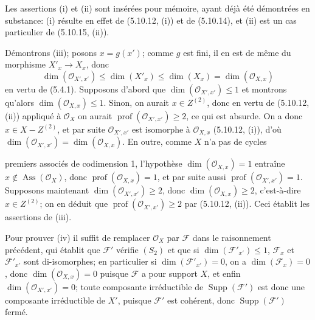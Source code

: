 \documentclass[10pt,oneside]{book}
\newcommand{\oldpage}[2][]{%
  \setcounter{footnote}{0}%
  \marginpar{\scriptsize\textbf{#1}~|~#2}\ignorespaces}
\begin{document}
Les assertions (i) et (ii) sont insérées pour mémoire, ayant déjà été
démontrées en substance: (i) résulte en effet de (5.10.12, (i)) et de
(5.10.14), et (ii) est un cas particulier de (5.10.15, (ii)).

Démontrons (iii); posons $x=g(x')$; comme $g$ est fini, il en est de même du
morphisme $X'_x\to X_x$, donc
\[
\dim(\mathcal O_{X',x'})\leq\dim(X'_x)\leq\dim(X_x)
=\dim(\mathcal O_{X,x})
\]
en vertu de (5.4.1). Supposons d'abord que
$\dim(\mathcal O_{X',x'})\leq1$ et montrons qu'alors
$\dim(\mathcal O_{X,x})\leq1$. Sinon, on aurait $x\in Z^{(2)}$, donc en vertu
de (5.10.12, (ii)) appliqué à $\mathcal O_X$ on aurait
$\operatorname{prof}(\mathcal O_{X',x'})\geq2$, ce qui est absurde. On a donc
$x\in X-Z^{(2)}$, et par suite $\mathcal O_{X',x'}$ est isomorphe à
$\mathcal O_{X,x}$ (5.10.12, (i)), d'où
$\dim(\mathcal O_{X',x'})=\dim(\mathcal O_{X,x})$. En outre, comme $X$ n'a
pas de cycles

\oldpage[IV-2]{121}

premiers associés de codimension 1, l'hypothèse
$\dim(\mathcal O_{X,x})=1$ entraîne $x\notin\operatorname{Ass}(\mathcal O_X)$,
donc $\operatorname{prof}(\mathcal O_{X,x})=1$, et par suite aussi
$\operatorname{prof}(\mathcal O_{X',x'})=1$. Supposons maintenant
$\dim(\mathcal O_{X',x'})\geq2$, donc $\dim(\mathcal O_{X,x})\geq2$,
c'est-à-dire $x\in Z^{(2)}$; on en déduit que
$\operatorname{prof}(\mathcal O_{X',x'})\geq2$ par (5.10.12, (ii)). Ceci
établit les assertions de (iii).

Pour prouver (iv) il suffit de remplacer $\mathcal O_X$ par $\mathcal F$ dans
le raisonnement précédent, qui établit que $\mathcal F'$ vérifie $(S_2)$ et
que si $\dim(\mathcal F'_{x'})\leq1$, $\mathcal F_x$ et
$\mathcal F'_{x'}$ sont di-isomorphes; en particulier si
$\dim(\mathcal F'_{x'})=0$, on a $\dim(\mathcal F_x)=0$, donc
$\dim(\mathcal O_{X,x})=0$ puisque $\mathcal F$ a pour support $X$, et enfin
$\dim(\mathcal O_{X',x'})=0$; toute composante irréductible de
$\operatorname{Supp}(\mathcal F')$ est donc une composante irréductible de
$X'$, puisque $\mathcal F'$ est cohérent, donc
$\operatorname{Supp}(\mathcal F')$ fermé.
\end{document}
